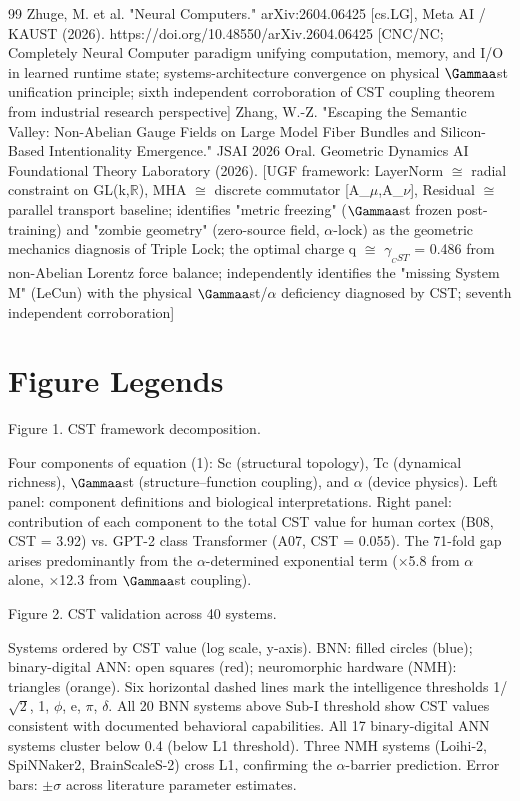 \documentclass[a4paper,12pt]{article}
\begin{document}
\begin{thebibliography}{99}
 Zhuge, M. et al. "Neural Computers." arXiv:2604.06425 [cs.LG], Meta AI / KAUST (2026). https://doi.org/10.48550/arXiv.2604.06425 [CNC/NC; Completely Neural Computer paradigm unifying computation, memory, and I/O in learned runtime state; systems-architecture convergence on physical $\Gammaa$st unification principle; sixth independent corroboration of CST coupling theorem from industrial research perspective]
 Zhang, W.-Z. "Escaping the Semantic Valley: Non-Abelian Gauge Fields on Large Model Fiber Bundles and Silicon-Based Intentionality Emergence." JSAI 2026 Oral. Geometric Dynamics AI Foundational Theory Laboratory (2026). [UGF framework: LayerNorm $\cong$ radial constraint on GL(k,$\mathbb{R}$), MHA $\cong$ discrete commutator [A_$\mu$,A_$\nu$], Residual $\cong$ parallel transport baseline; identifies "metric freezing" ($\Gammaa$st frozen post-training) and "zombie geometry" (zero-source field, $\alpha$-lock) as the geometric mechanics diagnosis of Triple Lock; the optimal charge q $\cong$ $\gamma_{_CST}$ = 0.486 from non-Abelian Lorentz force balance; independently identifies the "missing System M" (LeCun) with the physical $\Gammaa$st/$\alpha$ deficiency diagnosed by CST; seventh independent corroboration]
\end{thebibliography}

\section*{Figure Legends}
Figure 1. CST framework decomposition.

Four components of equation (1): Sc (structural topology), Tc (dynamical richness), $\Gammaa$st (structure--function coupling), and $\alpha$ (device physics). Left panel: component definitions and biological interpretations. Right panel: contribution of each component to the total CST value for human cortex (B08, CST = 3.92) vs. GPT-2 class Transformer (A07, CST = 0.055). The 71-fold gap arises predominantly from the $\alpha$-determined exponential term ($\times$5.8 from $\alpha$ alone, $\times$12.3 from $\Gammaa$st coupling).

Figure 2. CST validation across 40 systems.

Systems ordered by CST value (log scale, y-axis). BNN: filled circles (blue); binary-digital ANN: open squares (red); neuromorphic hardware (NMH): triangles (orange). Six horizontal dashed lines mark the intelligence thresholds {1/$\sqrt{2}$, 1, $\phi$, e, $\pi$, $\delta$}. All 20 BNN systems above Sub-I threshold show CST values consistent with documented behavioral capabilities. All 17 binary-digital ANN systems cluster below 0.4 (below L1 threshold). Three NMH systems (Loihi-2, SpiNNaker2, BrainScaleS-2) cross L1, confirming the $\alpha$-barrier prediction. Error bars: $\pm$$\sigma$ across literature parameter estimates.
\end{document}
